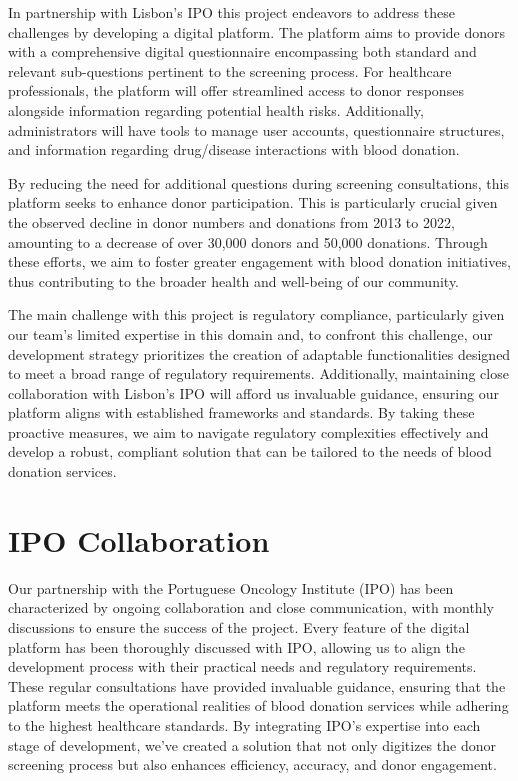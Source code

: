 In partnership with Lisbon's IPO this project endeavors to address these challenges by developing a digital platform. The platform aims to provide donors with a comprehensive digital questionnaire encompassing both standard and relevant sub-questions pertinent to the screening process. For healthcare professionals, the platform will offer streamlined access to donor responses alongside information regarding potential health risks. Additionally, administrators will have tools to manage user accounts, questionnaire structures, and information regarding drug/disease interactions with blood donation.

By reducing the need for additional questions during screening consultations, this platform seeks to enhance donor participation. This is particularly crucial given the observed decline in donor numbers and donations from 2013 to 2022, amounting to a decrease of over 30,000 donors and 50,000 donations. Through these efforts, we aim to foster greater engagement with blood donation initiatives, thus contributing to the broader health and well-being of our community.

The main challenge with this project is regulatory compliance, particularly given our team's limited expertise in this domain and, to confront this challenge, our development strategy prioritizes the creation of adaptable functionalities designed to meet a broad range of regulatory requirements. Additionally, maintaining close collaboration with Lisbon's IPO will afford us invaluable guidance, ensuring our platform aligns with established frameworks and standards. By taking these proactive measures, we aim to navigate regulatory complexities effectively and develop a robust, compliant solution that can be tailored to the needs of blood donation services.

\section{IPO Collaboration}
Our partnership with the Portuguese Oncology Institute (IPO) has been characterized by ongoing collaboration and close communication, with monthly discussions to ensure the success of the project. Every feature of the digital platform has been thoroughly discussed with IPO, allowing us to align the development process with their practical needs and regulatory requirements. These regular consultations have provided invaluable guidance, ensuring that the platform meets the operational realities of blood donation services while adhering to the highest healthcare standards. By integrating IPO’s expertise into each stage of development, we’ve created a solution that not only digitizes the donor screening process but also enhances efficiency, accuracy, and donor engagement.


